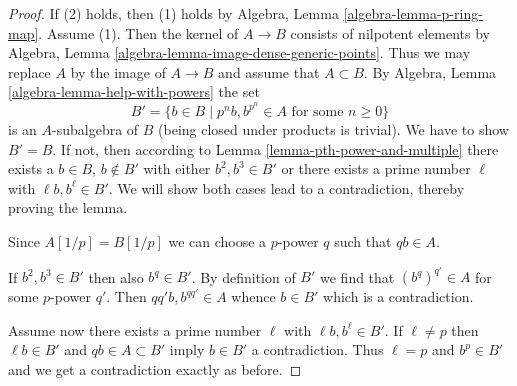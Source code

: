 \documentclass[10pt,a4paper]{amsart}
\theoremstyle{plain}
\theoremstyle{definition}
\theoremstyle{remark}
\numberwithin{equation}{subsection}
\begin{document}
\begin{proof}
If (2) holds, then (1) holds by Algebra, Lemma \ref{algebra-lemma-p-ring-map}.
Assume (1). Then the kernel of $A \to B$ consists of nilpotent
elements by Algebra, Lemma \ref{algebra-lemma-image-dense-generic-points}.
Thus we may replace $A$ by the image of $A \to B$ and assume that
$A \subset B$. By Algebra, Lemma \ref{algebra-lemma-help-with-powers}
the set
$$
B' = \{b \in B \mid p^nb, b^{p^n} \in A\text{ for some }n \geq 0\}
$$
is an $A$-subalgebra of $B$ (being closed under products is trivial).
We have to show $B' = B$. If not, then
according to Lemma \ref{lemma-pth-power-and-multiple}
there exists a $b \in B$, $b \not \in B'$ with either
$b^2, b^3 \in B'$ or there exists a prime number $\ell$
with $\ell b, b^\ell \in B'$.
We will show both cases lead to a contradiction, thereby proving the lemma.

\medskip\noindent
Since $A[1/p] = B[1/p]$ we can choose a $p$-power $q$ such that $qb \in A$.

\medskip\noindent
If $b^2, b^3 \in B'$ then also $b^q \in B'$. By definition of $B'$
we find that $(b^q)^{q'} \in A$ for some $p$-power $q'$.
Then $qq'b, b^{qq'} \in A$ whence $b \in B'$ which is a contradiction.

\medskip\noindent
Assume now there exists a prime number $\ell$ with $\ell b, b^\ell \in B'$.
If $\ell \not = p$ then $\ell b \in B'$ and $qb \in A \subset B'$ imply
$b \in B'$ a contradiction. Thus $\ell = p$ and $b^p \in B'$
and we get a contradiction exactly as before.
\end{proof}
\end{document}
